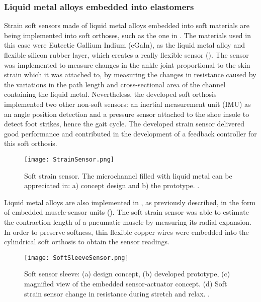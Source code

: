 \subsubsection{Liquid metal alloys embedded into elastomers}

Strain soft sensors made of liquid metal alloys embedded into soft materials are being implemented into soft orthoses, such as the one in \cite{park2011bio}. The materials used in this case were Eutectic Gallium Indium (eGaIn), as the liquid metal alloy and flexible silicon rubber layer, which creates a really flexible sensor (). The sensor was implemented to measure changes in the ankle joint proportional to the skin strain which it was attached to, by measuring the changes in resistance caused by the variations in the path length and cross-sectional area of the channel containing the liquid metal. Nevertheless, the developed soft orthosis implemented two other non-soft sensors: an inertial measurement unit (IMU) as an angle position detection and a pressure sensor attached to the shoe insole to detect foot strikes, hence the gait cycle. The developed strain sensor delivered good performance and contributed in the development of a feedback controller for this soft orthosis.

\begin{figure}[hbtp!]
    \centering
    \texttt{[image: StrainSensor.png]}
    \caption{Soft strain sensor. The microchannel filled with liquid metal can be appreciated in: a) concept design and b) the prototype. \cite{park2011bio}. }
    \label{fig:strain_sensor}
\end{figure}

Liquid metal alloys are also implemented in \cite{Park2012}, as previously described, in the form of embedded muscle-sensor units (). The soft strain sensor was able to estimate the contraction length of a pneumatic muscle by measuring its radial expansion. In order to preserve softness, thin flexible copper wires were embedded into the cylindrical soft orthosis to obtain the sensor readings.

\begin{figure}[hbtp!]
    \centering
    \texttt{[image: SoftSleeveSensor.png]}
    \caption{Soft sensor sleeve: (a) design concept, (b) developed prototype, (c) magnified view of the embedded sensor-actuator concept. (d) Soft strain sensor change in resistance during stretch and relax. \cite{Park2012}. }
    \label{fig:soft_sleeve_sensor}
\end{figure}

